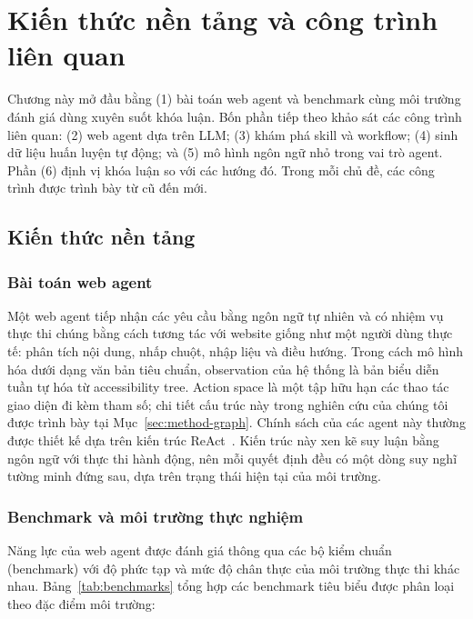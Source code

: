 \chapter{Kiến thức nền tảng và công trình liên quan}
\label{ch:related}

Chương này mở đầu bằng (1) bài toán web agent và benchmark cùng môi trường đánh giá dùng xuyên suốt khóa luận. Bốn phần tiếp theo khảo sát các công trình liên quan: (2) web agent dựa trên LLM; (3) khám phá skill và workflow; (4) sinh dữ liệu huấn luyện tự động; và (5) mô hình ngôn ngữ nhỏ trong vai trò agent. Phần (6) định vị khóa luận so với các hướng đó. Trong mỗi
chủ đề, các công trình được trình bày từ cũ đến mới.


\section{Kiến thức nền tảng}
\label{sec:rel-background}

\subsection{Bài toán web agent}

Một web agent tiếp nhận các yêu cầu bằng ngôn ngữ tự nhiên
và có nhiệm vụ thực thi chúng bằng cách tương tác với website giống như
một người dùng thực tế: phân tích nội dung, nhấp chuột, nhập liệu và điều
hướng. Trong cách mô hình hóa dưới dạng văn bản tiêu chuẩn, observation của
hệ thống là bản biểu diễn tuần tự hóa từ accessibility tree.
Action space là một tập hữu hạn
các thao tác giao diện đi kèm tham số; chi tiết cấu trúc này trong nghiên cứu
của chúng tôi được trình bày tại Mục~\ref{sec:method-graph}.
Chính sách của các agent này thường được thiết kế dựa trên
kiến trúc ReAct~\cite{yao2023react}. Kiến trúc này xen kẽ suy luận bằng ngôn ngữ với thực thi hành động, nên mỗi quyết định đều có một dòng suy nghĩ tường minh đứng sau, dựa trên trạng thái hiện tại của môi trường.

\subsection{Benchmark và môi trường thực nghiệm}
\label{sec:rel-benchmarks}

Năng lực của web agent được đánh giá thông qua các bộ kiểm chuẩn (benchmark) với độ phức tạp và mức độ chân thực của môi trường thực thi khác nhau. Bảng~\ref{tab:benchmarks} tổng hợp các benchmark tiêu biểu được phân loại theo đặc điểm môi trường:

